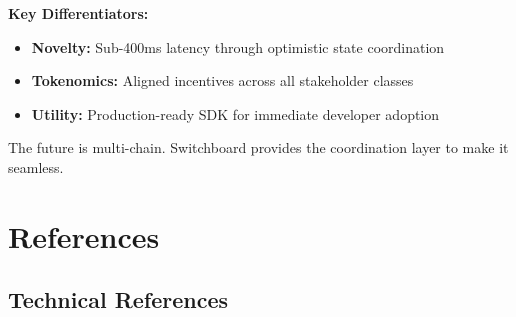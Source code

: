 \documentclass[12pt,a4paper]{article}
\begin{document}
\textbf{Key Differentiators:}
\begin{itemize}
    \item \textbf{Novelty:} Sub-400ms latency through optimistic state coordination
    \item \textbf{Tokenomics:} Aligned incentives across all stakeholder classes
    \item \textbf{Utility:} Production-ready SDK for immediate developer adoption
\end{itemize}

The future is multi-chain. Switchboard provides the coordination layer to make it seamless.

\section{References}

\subsection{Technical References}
\end{document}
